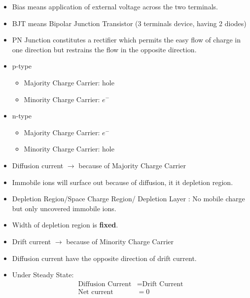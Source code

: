 \documentclass[a4aper,12pt]{report}
\begin{document}
\begin{itemize}
    \item Bias means application of external voltage across the two terminals. 
    \item BJT means Bipolar Junction Transistor (3 terminals device, having 2 diodes)
    \item PN Junction constitutes a rectifier which permits the easy flow of charge in one direction but restrains the flow in the opposite direction. 
    \item p-type
    \begin{itemize}
        \item Majority Charge Carrier: hole
        \item Minority Charge Carrier: $e^-$
    \end{itemize}
    \item n-type
    \begin{itemize}
        \item Majority Charge Carrier: $e^-$
        \item Minority Charge Carrier: hole
    \end{itemize}
    \item Diffusion current $\longrightarrow$ because of Majority Charge Carrier 
    \item Immobile ions will surface out because of diffusion, it it depletion region. 
    \item Depletion Region/Space Charge Region/ Depletion Layer : No mobile charge but only uncovered immobile ions. 
    \item Width of depletion region is \textbf{fixed}.
    \item Drift current $\longrightarrow$ because of Minority Charge Carrier 
    \item Diffusion current have the opposite direction of drift current.
    \item Under Steady State: \begin{align*}
        \text{Diffusion Current} &= \text{Drift Current} \\ 
        \text{Net current } &= 0
    \end{align*}
\end{itemize}
\end{document}
